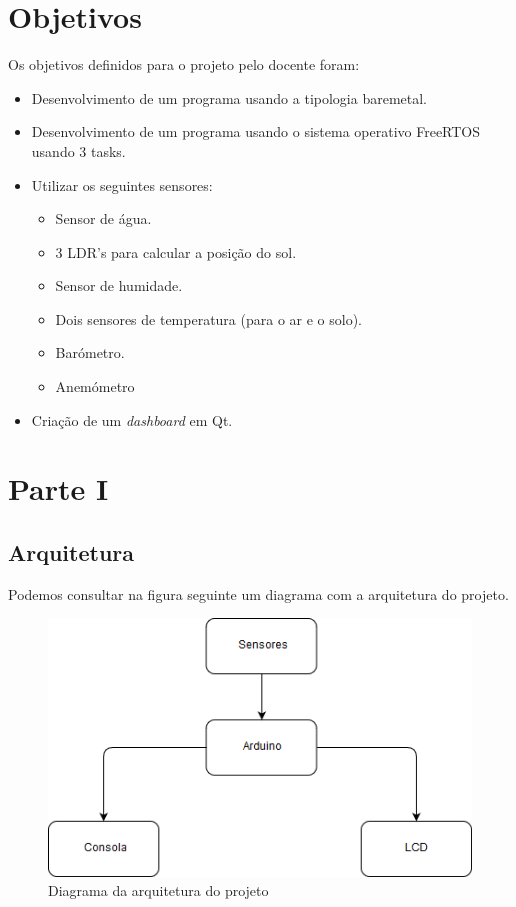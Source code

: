 \documentclass[11pt]{report}
\begin{document}
\chapter*{Objetivos}

Os objetivos definidos para o projeto pelo docente foram:

\begin{itemize}
\item Desenvolvimento de um programa usando a tipologia baremetal.
\item Desenvolvimento de um programa usando o sistema operativo FreeRTOS usando 3 tasks.
\item Utilizar os seguintes sensores:
\begin{itemize}
\item Sensor de água.
\item 3 LDR's para calcular a posição do sol.
\item Sensor de humidade.
\item Dois sensores de temperatura (para o ar e o solo).
\item Barómetro.
\item Anemómetro 
\end{itemize}
\item Criação de um \textit{dashboard} em Qt.
\end{itemize}


\clearpage


\chapter*{Parte I}

\section*{Arquitetura}

Podemos consultar na figura seguinte um diagrama com a arquitetura do projeto.


\begin{figure} [!h]
\centering
\includegraphics[width=\textwidth]{Prints/arquitectura.png}
\caption{Diagrama da arquitetura do projeto}
\end{figure}
\end{document}
